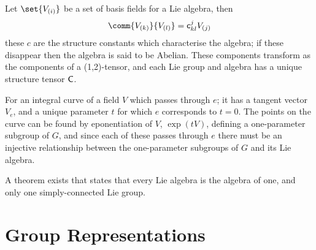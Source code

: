 Let $\set{V_{(i)}}$ be a set of basis fields for a Lie algebra, then
\begin{equation}
  \label{eq:25}
  \comm{V_{(k)}}{V_{(l)}} = \ten{c}_{kl}^j V_{(j)}
\end{equation}
these $c$ are the structure constants which characterise the algebra;
if these disappear then the algebra is said to be Abelian. These
components transform as the components of a (1,2)-tensor, and each Lie
group and algebra has a unique structure tensor $\mathsf{{C}}$.

For an integral curve of a field $V$ which passes through $e$; it has
a tangent vector $V_e$, and a unique parameter $t$ for which $e$
corresponds to $t=0$. The points on the curve can be found by
eponentiation of $V$, $\exp(tV)$, defining a one-parameter subgroup of
$G$, and since each of these passes through $e$ there must be an
injective relationship between the one-parameter subgroups of $G$ and
its Lie algebra.

A theorem exists that states that every Lie algebra is the algebra of
one, and only one simply-connected Lie group.

\section{Group Representations} 
\label{sec:group-repr}

\newcommand{\group}[1]{\mathrm{#1}}

